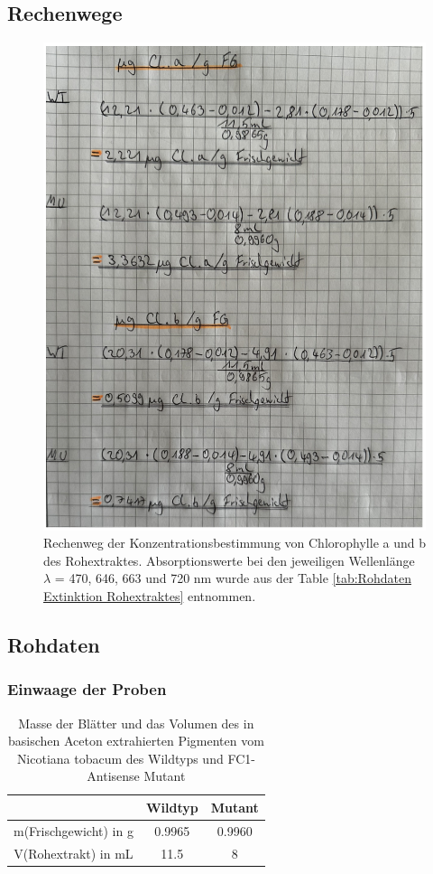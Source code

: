 \documentclass[10pt,a4paper]{article}
\begin{document}
		\subsection{Rechenwege}\label{rechenwegabschnitt}
			\begin{figure}[H]
				\centering
				\includegraphics[scale=0.8]{Rechenweg_frido}
				\caption{Rechenweg der Konzentrationsbestimmung von Chlorophylle a und b des Rohextraktes. Absorptionswerte bei den jeweiligen Wellenlänge $\lambda$ = 470, 646, 663 und 720 nm wurde aus der Table \ref{tab:Rohdaten Extinktion Rohextraktes} entnommen.}
				\label{fig:Konzentrationsbestimmungrechenweg}
			\end{figure}
		\subsection{Rohdaten}
			\subsubsection{Einwaage der Proben }
				\begin{table}[H]
					\centering
					\caption{Masse der Blätter und das Volumen des in basischen Aceton extrahierten Pigmenten vom Nicotiana tobacum des Wildtyps und FC1-Antisense Mutant}
					\label{tab:Probemassen und Volumen}
					\begin{tabular}{ccc}
						\toprule
						&Wildtyp& Mutant\\
						\midrule
						m(Frischgewicht) in g & 0.9965 & 0.9960\\
						V(Rohextrakt) in mL & 11.5 & 8\\
						\bottomrule
					\end{tabular}
				\end{table}
				
\end{document}
